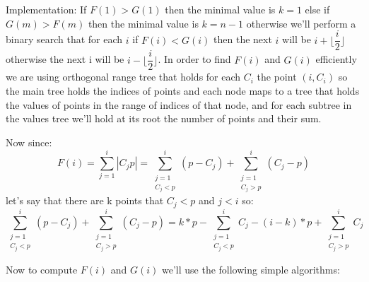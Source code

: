 \documentclass{article}
\theoremstyle{remark}
\theoremstyle{definition}
\begin{document}
	Implementation:
	If $F(1)>G(1)$ then the minimal value is $k=1$ else if $G(m)>F(m)$ then the minimal value is $k=n-1$ otherwise we'll perform a binary search that for each $i$ if $F(i)<G(i)$ then the next $i$ will be $i+\lfloor\dfrac{i}{2}\rfloor$ otherwise the next i will be $i-\lfloor\dfrac{i}{2}\rfloor$. In order to find $F(i)$ and $G(i)$ efficiently we are using orthogonal range tree that holds for each $C_i$ the point $(i, C_i)$ so the main tree holds the indices of points and each node maps to a tree that holds the values of points in the range of indices of that node, 
	and for each subtree in the values tree we'll hold at its root the number of points and their sum.
	
	Now since: 
	$$F(i)=\displaystyle\sum_{j=1}^{i}|C_j p| = \displaystyle\sum_{\substack{j=1 \\ C_j<p}}^{i}(p - C_j) + \displaystyle\sum_{\substack{j=1 \\ C_j>p}}^{i}(C_j - p)$$ 
	let's say that there are k points that $C_j<p$ and $j<i$ so:
	$$\displaystyle\sum_{\substack{j=1 \\ C_j<p}}^{i}(p - C_j) + \displaystyle\sum_{\substack{j=1 \\ C_j>p}}^{i}(C_j - p) =
	   k*p - \displaystyle\sum_{\substack{j=1 \\ C_j<p}}^{i}C_j - (i-k)*p +  \displaystyle\sum_{\substack{j=1 \\ C_j>p}}^{i}C_j$$
	   
	Now to compute $F(i)$ and $G(i)$ we'll use the following simple algorithms:
\end{document}
